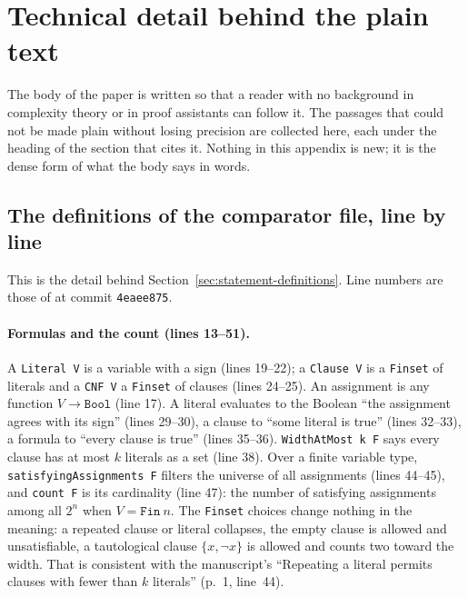 \section{Technical detail behind the plain text}
\label{app:tech}
\begingroup\sloppy

The body of the paper is written so that a reader with no background in
complexity theory or in proof assistants can follow it. The passages that
could not be made plain without losing precision are collected here, each
under the heading of the section that cites it. Nothing in this appendix
is new; it is the dense form of what the body says in words.

\subsection{The definitions of the comparator file, line by line}
\label{app:tech-definitions}

This is the detail behind Section~\ref{sec:statement-definitions}. Line
numbers are those of
 at commit
\texttt{4eaee875}.

\paragraph{Formulas and the count (lines 13--51).}
A \texttt{Literal V} is a variable with a sign (lines 19--22); a
\texttt{Clause V} is a \texttt{Finset} of literals and a \texttt{CNF V} a
\texttt{Finset} of clauses (lines 24--25). An assignment is any function
\(V \to \mathtt{Bool}\) (line 17). A literal evaluates to the Boolean
``the assignment agrees with its sign'' (lines 29--30), a clause to ``some
literal is true'' (lines 32--33), a formula to ``every clause is true''
(lines 35--36). \texttt{WidthAtMost k F} says every clause has at most
\(k\) literals as a set (line 38). Over a finite variable type,
\texttt{satisfyingAssignments F} filters the universe of all assignments
(lines 44--45), and \texttt{count F} is its cardinality (line 47): the
number of satisfying assignments among all \(2^n\) when
\(V = \mathtt{Fin}\ n\). The \texttt{Finset} choices change nothing in the
meaning: a repeated clause or literal collapses, the empty clause is
allowed and unsatisfiable, a tautological clause \(\{x, \neg x\}\) is
allowed and counts two toward the width. That is consistent with the
manuscript's ``Repeating a literal permits clauses with fewer than \(k\)
literals'' (p.~1, line~44).

